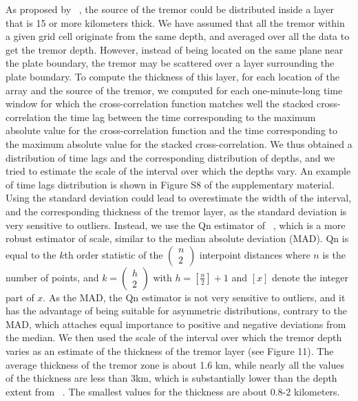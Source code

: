 \documentclass[draft]{agujournal2019}
\begin{document}
As proposed by ~, the source of the tremor could be distributed inside a layer that is 15 or more kilometers thick. We have assumed that all the tremor within a given grid cell originate from the same depth, and averaged over all the data to get the tremor depth. However, instead of being located on the same plane near the plate boundary, the tremor may be scattered over a layer surrounding the plate boundary. To compute the thickness of this layer, for each location of the array and the source of the tremor, we computed for each one-minute-long time window for which the cross-correlation function matches well the stacked cross-correlation the time lag between the time corresponding to the maximum absolute value for the cross-correlation function and the time corresponding to the maximum absolute value for the stacked cross-correlation. We thus obtained a distribution of time lags and the corresponding distribution of depths, and we tried to estimate the scale of the interval over which the depths vary. An example of time lags distribution is shown in Figure S8 of the supplementary material. Using the standard deviation could lead to overestimate the width of the interval, and the corresponding thickness of the tremor layer, as the standard deviation is very sensitive to outliers. Instead, we use the Qn estimator of ~, which is a more robust estimator of scale, similar to the median absolute deviation (MAD). Qn is equal to the $k$th order statistic of the $\begin{pmatrix} n \\ 2 \end{pmatrix}$ interpoint distances where $n$ is the number of points, and $k = \begin{pmatrix} h \\ 2 \end{pmatrix}$ with $h = \left[ \frac{n}{2} \right] + 1$ and $\left[ x \right]$ denote the integer part of $x$. As the MAD, the Qn estimator is not very sensitive to outliers, and it has the advantage of being suitable for asymmetric distributions, contrary to the MAD, which attaches equal importance to positive and negative deviations from the median. We then used the scale of the interval over which the tremor depth varies as an estimate of the thickness of the tremor layer (see Figure 11). The average thickness of the tremor zone is about 1.6 km, while nearly all the values of the thickness are less than 3km, which is substantially lower than the depth extent from ~. The smallest values for the thickness are about 0.8-2 kilometers. \\
\end{document}
